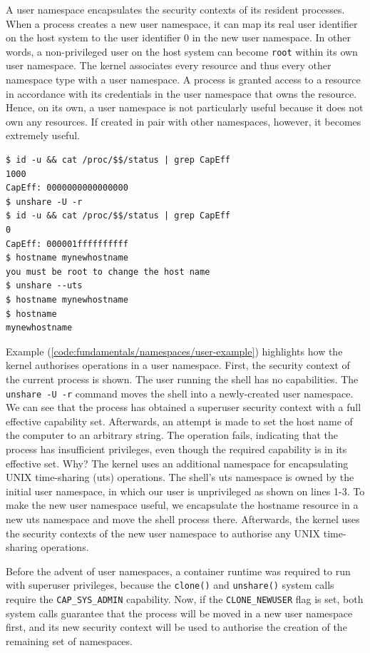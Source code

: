 A user namespace encapsulates the security contexts of its resident processes. 
When a process creates a new user namespace, it can map its real user identifier on the host system 
to the user identifier 0 in the new user namespace.
In other words, a non-privileged user on the host system can become \verb|root| within its own 
user namespace.
The kernel associates every resource and thus every other namespace type 
with a user namespace. A process is granted access to a resource in accordance with its 
credentials in the user namespace that owns the resource. 
Hence, on its own, a user namespace is not particularly useful because it does not 
own any resources. If created in pair with other namespaces, however, it becomes 
extremely useful.
\begin{lstlisting}[label={code:fundamentals/namespaces/user-example}, style=bash, caption={Example of resource ownership semantics with user namespaces}]
$ id -u && cat /proc/$$/status | grep CapEff
1000
CapEff:	0000000000000000
$ unshare -U -r  
$ id -u && cat /proc/$$/status | grep CapEff
0
CapEff:	000001ffffffffff
$ hostname mynewhostname
you must be root to change the host name
$ unshare --uts
$ hostname mynewhostname
$ hostname 
mynewhostname 
\end{lstlisting}
Example (\ref{code:fundamentals/namespaces/user-example}) highlights how the kernel authorises operations in a user namespace.
First, the security context of the current process is shown. The user running the shell has no capabilities. 
The \verb|unshare -U -r| command moves the shell into a newly-created user namespace. 
We can see that the process has obtained a superuser security context with a full effective 
capability set. Afterwards, an attempt is made to set the host name of the computer to an arbitrary string.
The operation fails, indicating that the process has insufficient privileges, even though the required 
capability is in its effective set. Why? The kernel uses an additional namespace for 
encapsulating UNIX time-sharing (uts) operations. The shell's uts namespace is owned by 
the initial user namespace, in which our user is unprivileged as shown on lines 1-3. 
To make the new user namespace useful, we encapsulate the hostname resource in a new uts namespace 
and move the shell process there. Afterwards, the kernel uses the security contexts of the new  
user namespace to authorise any UNIX time-sharing operations.

Before the advent of user namespaces,
a container runtime was required to run with superuser privileges,  
because the \verb|clone()| and \verb|unshare()| system calls require the \verb|CAP_SYS_ADMIN| 
capability. Now, if the \verb|CLONE_NEWUSER| flag is set, both system calls guarantee that the 
process will be moved in a new user namespace first, and its new security context will be used 
to authorise the creation of the remaining set of namespaces.

